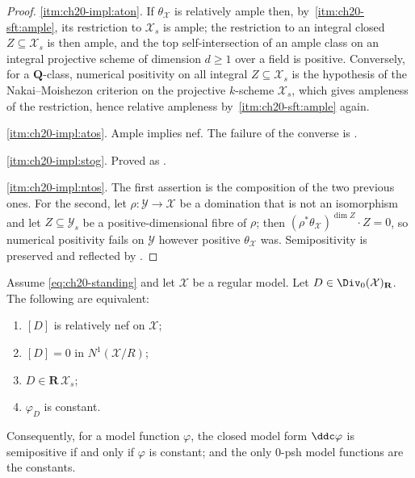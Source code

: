 \begin{proof}
\cref{itm:ch20-impl:aton}.  If $\theta_{\mathcal X}$ is relatively ample
then, by
\,\cref{itm:ch20-sft:ample}, its
restriction to $\mathcal X_s$ is ample; the restriction to an integral
closed $Z\subseteq\mathcal X_s$ is then ample, and the top
self-intersection of an ample class on an integral projective scheme of
dimension $d\geq1$ over a field is positive.  Conversely, for a
$\mathbf Q$-class, numerical positivity on all integral
$Z\subseteq\mathcal X_s$ is the hypothesis of the Nakai--Moishezon
criterion on the projective $k$-scheme $\mathcal X_s$, which gives
ampleness of the restriction, hence relative ampleness by
\,\cref{itm:ch20-sft:ample} again.

\cref{itm:ch20-impl:atos}.  Ample implies nef.  The failure of the converse
is .

\cref{itm:ch20-impl:stog}.  Proved as
.

\cref{itm:ch20-impl:ntos}.  The first assertion is the composition of the
two previous ones.  For the second, let $\rho:\mathcal Y\to\mathcal X$ be
a domination that is not an isomorphism and let $Z\subseteq\mathcal Y_s$
be a positive-dimensional fibre of $\rho$; then
$(\rho^*\theta_{\mathcal X})^{\dim Z}\cdot Z=0$, so numerical positivity
fails on $\mathcal Y$ however positive $\theta_{\mathcal X}$ was.
Semipositivity is preserved and reflected by
.
\end{proof}

\begin{theorem}
\label{thm:ch20-vertical-nef-rigidity}
Assume \eqref{eq:ch20-standing} and let $\mathcal X$ be a regular model.
Let $D\in\Div_0(\mathcal X)_{\mathbf R}$.  The following are equivalent:
\begin{enumerate}
\item\label{itm:ch20-rig:nef} $[D]$ is relatively nef on $\mathcal X$;
\item\label{itm:ch20-rig:zero} $[D]=0$ in $N^1(\mathcal X/R)$;
\item\label{itm:ch20-rig:prop} $D\in\mathbf R\,\mathcal X_s$;
\item\label{itm:ch20-rig:const} $\varphi_D$ is constant.
\end{enumerate}
Consequently, for a model function $\varphi$, the closed model form
$\ddc\varphi$ is semipositive if and only if $\varphi$ is constant; and
the only $0$-psh model functions are the constants.
\end{theorem}

